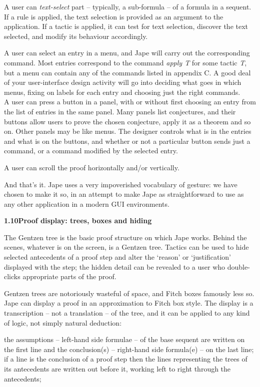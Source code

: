 \documentclass[11pt]{book}
\newcommand{\tab}{\hspace{5mm}}
\begin{document}
{\textbullet}\tab A user can \textit{text-select} part -- typically, a sub-formula -- of a formula in a sequent. If a rule is applied, the text selection is provided as an argument to the application. If a tactic is applied, it can test for text selection, discover the text selected, and modify its behaviour accordingly.


{\textbullet}\tab A user can select an entry in a menu, and Jape will carry out the corresponding command. Most entries correspond to the command \textit{apply T} for some tactic \textit{T}, but a menu can contain any of the commands listed in appendix C. A good deal of your user-interface design activity will go into deciding what goes in which menus, fixing on labels for each entry and choosing just the right commands.\\
{\textbullet}\tab A user can press a button in a panel, with or without first choosing an entry from the list of entries in the same panel. Many panels list conjectures, and their buttons allow users to prove the chosen conjecture, apply it as a theorem and so on. Other panels may be like menus. The designer controls what is in the entries and what is on the buttons, and whether or not a particular button sends just a command, or a command modified by the selected entry.


{\textbullet}\tab A user can scroll the proof horizontally and/or vertically.


And that's it. Jape uses a very impoverished vocabulary of gesture: we have chosen to make it so, in an attempt to make Jape as straightforward to use as any other application in a modern GUI environments.


\textbf{{\large 1.10\tab Proof display: trees, boxes and hiding}}


The Gentzen tree is the basic proof structure on which Jape works. Behind the scenes, whatever is on the screen, is a Gentzen tree. Tactics can be used to hide selected antecedents of a proof step and alter the `reason' or `justification' displayed with the step; the hidden detail can be revealed to a user who double-clicks appropriate parts of the proof.


Gentzen trees are notoriously wasteful of space, and Fitch boxes famously less so. Jape can display a proof in an approximation to Fitch box style. The display is a transcription -- not a translation -- of the tree, and it can be applied to any kind of logic, not simply natural deduction:


{\textbullet}\tab the assumptions -- left-hand side formulae -- of the base sequent are written on the first line and the conclusion(s) -- right-hand side formula(e) -- on the last line;\\
{\textbullet}\tab if a line is the conclusion of a proof step then the lines representing the trees of its antecedents are written out before it, working left to right through the antecedents;
\end{document}
